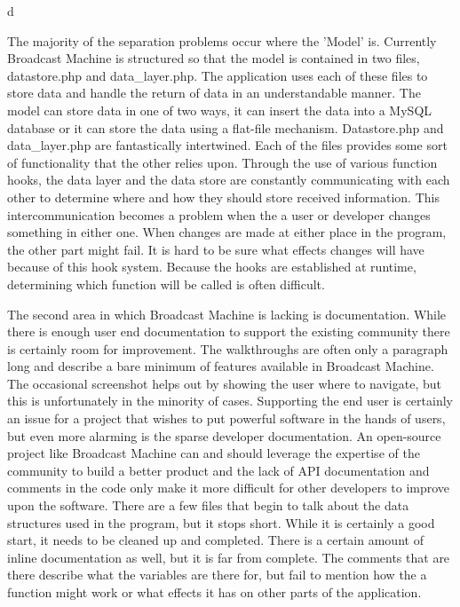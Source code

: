 d\documentclass[a4paper,12pt]{report}
\begin{document}
The majority of the separation problems occur where the 'Model' is. Currently Broadcast Machine is structured so that the model is contained in two files, datastore.php and data\_layer.php. The application uses each of these files to store data and handle the return of data in an understandable manner. The model can store data in one of two ways, it can insert the data into a MySQL database or it can store the data using a flat-file mechanism. Datastore.php and data\_layer.php are fantastically intertwined. Each of the files provides some sort of functionality that the other relies upon. Through the use of various function hooks, the data layer and the data store are constantly communicating with each other to determine where and how they should store received information. This intercommunication becomes a problem when the a user or developer changes something in either one. When changes are made at either place in the program, the other part might fail. It is hard to be sure what effects changes will have because of this hook system. Because the hooks are established at runtime, determining which function will be called is often difficult.
	
The second area in which Broadcast Machine is lacking is documentation. 
While there is enough user end documentation to support the existing community there is certainly room for improvement. 
The walkthroughs are often only a paragraph long and describe a bare minimum of features available in Broadcast Machine. 
The occasional screenshot helps out by showing the user where to navigate, but this is unfortunately in the minority of cases. 
Supporting the end user is certainly an issue for a project that wishes to put powerful software in the hands of users, but even more alarming is the sparse developer documentation. 
An open-source project like Broadcast Machine can and should leverage the expertise of the community to build a better product and the lack of API documentation and comments in the code only make it more difficult for other developers to improve upon the software. 
There are a few files that begin to talk about the data structures used in the program, but it stops short. 
While it is certainly a good start, it needs to be cleaned up and completed. There is a certain amount of inline documentation as well, but it is far from complete. 
The comments that are there describe what the variables are there for, but fail to mention how the a function might work or what effects it has on other parts of the application.
	
\end{document}
